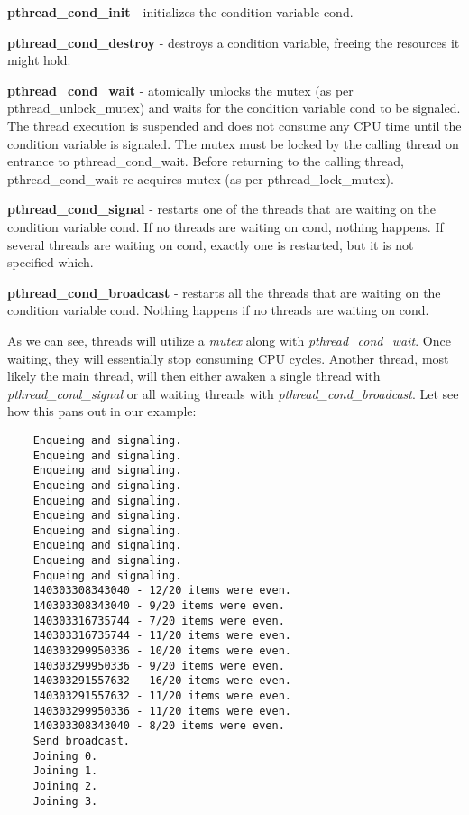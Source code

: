 \documentclass[../main.tex]{subfiles}
\begin{document}
	\textbf{pthread\_cond\_init} - initializes the condition variable cond.
		
	\textbf{pthread\_cond\_destroy} - destroys a condition variable, freeing the resources it might hold.
		
	\textbf{pthread\_cond\_wait} - atomically unlocks the mutex (as per pthread\_unlock\_mutex) and waits for the condition variable cond to be signaled. The thread execution is suspended and does not consume any  CPU	time  until the condition variable is signaled. The mutex must be locked by the calling thread on entrance to pthread\_cond\_wait. Before returning to the calling thread, pthread\_cond\_wait re-acquires mutex (as per pthread\_lock\_mutex).
		
	\textbf{pthread\_cond\_signal} - restarts  one of the threads that are waiting on the condition variable cond. If no threads are waiting on cond, nothing happens. If several threads are waiting on cond, exactly one is restarted, but it is not specified which.
		
	\textbf{pthread\_cond\_broadcast} - restarts all the threads that are waiting on the condition variable cond. Nothing happens if no threads are waiting on cond.

	As we can see, threads will utilize a \textit{mutex} along with \textit{pthread\_cond\_wait}.  Once waiting, they will essentially stop consuming CPU cycles.  Another thread, most likely the main thread, will then either awaken a single thread with \textit{pthread\_cond\_signal} or all waiting threads with \textit{pthread\_cond\_broadcast}.  Let see how this pans out in our example:\\
	
	
	\begin{verbatim}
	Enqueing and signaling.
	Enqueing and signaling.
	Enqueing and signaling.
	Enqueing and signaling.
	Enqueing and signaling.
	Enqueing and signaling.
	Enqueing and signaling.
	Enqueing and signaling.
	Enqueing and signaling.
	Enqueing and signaling.
	140303308343040 - 12/20 items were even.
	140303308343040 - 9/20 items were even.
	140303316735744 - 7/20 items were even.
	140303316735744 - 11/20 items were even.
	140303299950336 - 10/20 items were even.
	140303299950336 - 9/20 items were even.
	140303291557632 - 16/20 items were even.
	140303291557632 - 11/20 items were even.
	140303299950336 - 11/20 items were even.
	140303308343040 - 8/20 items were even.
	Send broadcast.
	Joining 0.
	Joining 1.
	Joining 2.
	Joining 3.
	\end{verbatim}
	
\end{document}
